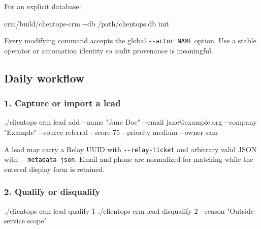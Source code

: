 \documentclass[
]{article}
\newenvironment{Shaded}{}{}
\newcommand{\AttributeTok}[1]{\textcolor[rgb]{0.49,0.56,0.16}{#1}}
\newcommand{\ExtensionTok}[1]{#1}
\newcommand{\NormalTok}[1]{#1}
\newcommand{\StringTok}[1]{\textcolor[rgb]{0.25,0.44,0.63}{#1}}
\begin{document}
For an explicit database:

\begin{Shaded}
\begin{Highlighting}[]
\ExtensionTok{crm/build/clientops{-}crm} \AttributeTok{{-}{-}db}\NormalTok{ /path/clientops.db init}
\end{Highlighting}
\end{Shaded}

Every modifying command accepts the global \texttt{-\/-actor\ NAME}
option. Use a stable operator or automation identity so audit provenance
is meaningful.

\subsection{Daily workflow}\label{daily-workflow}

\subsubsection{1. Capture or import a
lead}\label{1-capture-or-import-a-lead}

\begin{Shaded}
\begin{Highlighting}[]
\ExtensionTok{./clientops}\NormalTok{ crm lead add }\AttributeTok{{-}{-}name} \StringTok{"Jane Doe"} \AttributeTok{{-}{-}email}\NormalTok{ jane@example.org }\AttributeTok{{-}{-}company} \StringTok{"Example"} \AttributeTok{{-}{-}source}\NormalTok{ referral }\AttributeTok{{-}{-}score}\NormalTok{ 75 }\AttributeTok{{-}{-}priority}\NormalTok{ medium }\AttributeTok{{-}{-}owner}\NormalTok{ sam}
\end{Highlighting}
\end{Shaded}

A lead may carry a Relay UUID with \texttt{-\/-relay-ticket} and
arbitrary valid JSON with \texttt{-\/-metadata-json}. Email and phone
are normalized for matching while the entered display form is retained.

\subsubsection{2. Qualify or disqualify}\label{2-qualify-or-disqualify}

\begin{Shaded}
\begin{Highlighting}[]
\ExtensionTok{./clientops}\NormalTok{ crm lead qualify 1}
\ExtensionTok{./clientops}\NormalTok{ crm lead disqualify 2 }\AttributeTok{{-}{-}reason} \StringTok{"Outside service scope"}
\end{Highlighting}
\end{Shaded}
\end{document}
